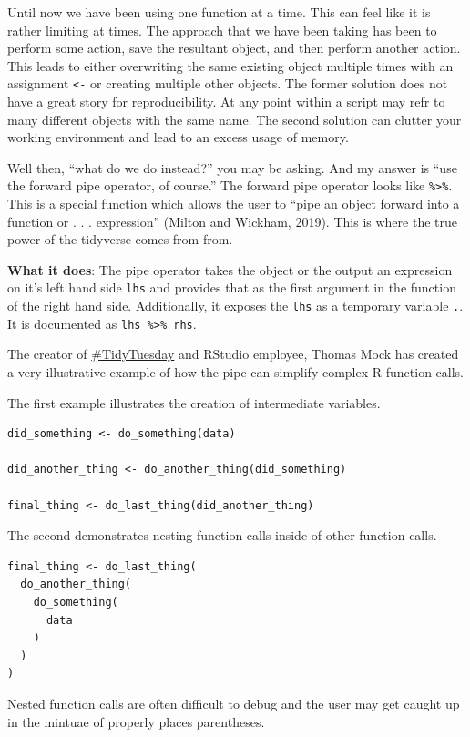 \documentclass[
]{book}
\begin{document}
Until now we have been using one function at a time. This can feel like it is rather limiting at times. The approach that we have been taking has been to perform some action, save the resultant object, and then perform another action. This leads to either overwriting the same existing object multiple times with an assignment \texttt{\textless{}-} or creating multiple other objects. The former solution does not have a great story for reproducibility. At any point within a script may refr to many different objects with the same name. The second solution can clutter your working environment and lead to an excess usage of memory.

Well then, ``what do we do instead?'' you may be asking. And my answer is ``use the forward pipe operator, of course.'' The forward pipe operator looks like \texttt{\%\textgreater{}\%}. This is a special function which allows the user to ``pipe an object forward into a function or . . . expression'' (Milton and Wickham, 2019). This is where the true power of the tidyverse comes from from.

\textbf{What it does}: The pipe operator takes the object or the output an expression on it's left hand side \texttt{lhs} and provides that as the first argument in the function of the right hand side. Additionally, it exposes the \texttt{lhs} as a temporary variable \texttt{.}. It is documented as \texttt{lhs\ \%\textgreater{}\%\ rhs}.

The creator of \href{https://github.com/rfordatascience/tidytuesday}{\#TidyTuesday} and RStudio employee, Thomas Mock has created a very illustrative example of how the pipe can simplify complex R function calls.

The first example illustrates the creation of intermediate variables.

\begin{verbatim}
did_something <- do_something(data)

did_another_thing <- do_another_thing(did_something)

final_thing <- do_last_thing(did_another_thing)
\end{verbatim}

The second demonstrates nesting function calls inside of other function calls.

\begin{verbatim}
final_thing <- do_last_thing(
  do_another_thing(
    do_something(
      data
    )
  )
)
\end{verbatim}

Nested function calls are often difficult to debug and the user may get caught up in the mintuae of properly places parentheses.
\end{document}
